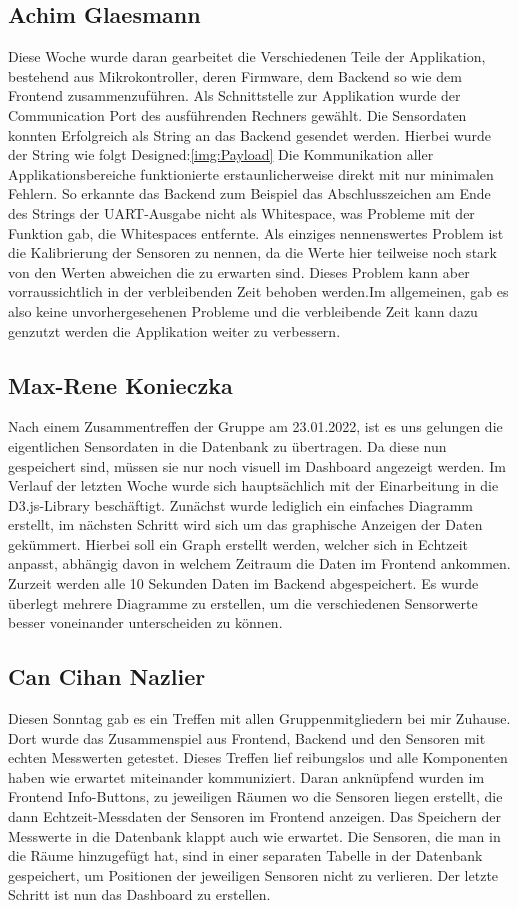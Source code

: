 \documentclass[]{article}
\begin{document}
\subsection{Achim Glaesmann}
Diese Woche wurde daran gearbeitet die Verschiedenen Teile der Applikation, bestehend aus Mikrokontroller, deren Firmware, dem Backend so wie dem Frontend zusammenzuführen. Als Schnittstelle zur Applikation wurde der Communication Port des ausführenden Rechners gewählt. Die Sensordaten konnten Erfolgreich als String an das Backend gesendet werden. Hierbei wurde der String wie folgt Designed:\ref{img:Payload}
Die Kommunikation aller Applikationsbereiche funktionierte erstaunlicherweise direkt mit nur minimalen Fehlern. So erkannte das Backend zum Beispiel das Abschlusszeichen am Ende des Strings der UART-Ausgabe nicht als Whitespace, was Probleme mit der Funktion gab, die Whitespaces entfernte.
 Als einziges nennenswertes Problem ist die Kalibrierung der Sensoren zu nennen, da die Werte hier teilweise noch stark von den Werten abweichen die zu erwarten sind. Dieses Problem kann aber vorraussichtlich in der verbleibenden Zeit behoben werden.Im allgemeinen, gab es also keine unvorhergesehenen Probleme und die verbleibende Zeit kann dazu genzutzt werden die Applikation weiter zu verbessern.


\subsection{Max-Rene Konieczka}
Nach einem Zusammentreffen der Gruppe am 23.01.2022, ist es uns gelungen die eigentlichen Sensordaten in die Datenbank zu übertragen. Da diese nun gespeichert sind, müssen sie nur noch visuell im Dashboard angezeigt werden. Im Verlauf der letzten Woche wurde sich hauptsächlich mit der Einarbeitung in die D3.js-Library beschäftigt. Zunächst wurde lediglich ein einfaches Diagramm erstellt, im nächsten Schritt wird sich um das graphische Anzeigen der Daten gekümmert. Hierbei soll ein Graph erstellt werden, welcher sich in Echtzeit anpasst, abhängig davon in welchem Zeitraum die Daten im Frontend ankommen. Zurzeit werden alle 10 Sekunden Daten im Backend abgespeichert. Es wurde überlegt mehrere Diagramme zu erstellen, um die verschiedenen Sensorwerte besser voneinander unterscheiden zu können.  

\subsection{Can Cihan Nazlier}
Diesen Sonntag gab es ein Treffen mit allen Gruppenmitgliedern bei mir Zuhause. Dort wurde das Zusammenspiel aus Frontend, Backend und den Sensoren mit echten Messwerten getestet. Dieses Treffen lief reibungslos und alle Komponenten haben wie erwartet miteinander kommuniziert. Daran anknüpfend wurden im Frontend Info-Buttons, zu jeweiligen Räumen wo die Sensoren liegen erstellt, die dann Echtzeit-Messdaten der Sensoren im Frontend anzeigen. Das Speichern der Messwerte in die Datenbank klappt auch wie erwartet.
Die Sensoren, die man in die Räume hinzugefügt hat, sind in einer separaten Tabelle in der Datenbank gespeichert, um Positionen der jeweiligen Sensoren nicht zu verlieren.
Der letzte Schritt ist nun das Dashboard zu erstellen.

\end{document}
